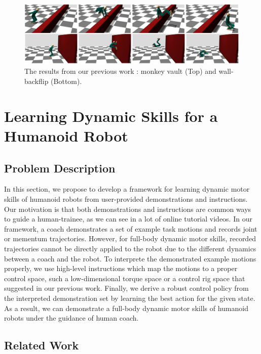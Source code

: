 \begin{figure}[htbp]
\center
  \includegraphics[width=\linewidth]{images/training1_teaser}
  \caption{The results from our previous work
    \cite{Ha:2014:ITD}:
    monkey vault (Top) and wall-backflip (Bottom).}
 \label{fig:training1_teaser}
\end{figure}


\section{Learning Dynamic Skills for a Humanoid Robot}

\subsection{Problem Description}

\indent

In this section, we propose to develop a framework for learning
dynamic motor skills of humanoid robots from user-provided demonstrations 
and instructions.
Our motivation is that both demonstrations and instructions are
common ways to guide a human-trainee, as we can see in a lot of
online tutorial videos.
In our framework, a coach demonstrates a set of example task motions
and records joint or mementum trajectories.
However, for full-body dynamic motor skills, recorded trajectories cannot 
be directly applied to the robot due to the different dynamics 
between a coach and the robot.
To interprete the demonstrated example motions properly,
we use high-level instructions which map the motions
to a proper control space, such a low-dimensional torque space 
or a control rig space \cite{Ha:2014:ITD} 
that suggested in our previous work.
Finally, we derive a robust control policy from the interpreted
demonstration set by learning the best action for the given state.
As a result, we can demonstrate a full-body dynamic motor skills
of humanoid robots under the guidance of human coach.

\subsection{Related Work}

